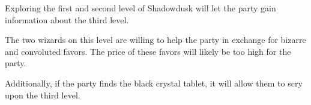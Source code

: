 Exploring the first and second level of Shadowdusk will let the party gain information about the third level.

The two wizards on this level are willing to help the party in exchange for bizarre and convoluted favors.
The price of these favors will likely be too high for the party.

Additionally, if the party finds the black crystal tablet, it will allow them to scry upon the third level.
